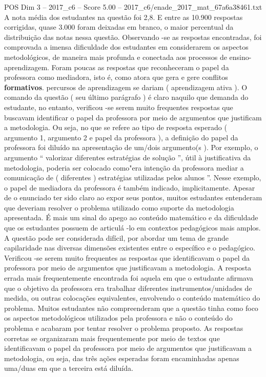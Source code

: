 \begin{textsample}{POS Dim 3 – 2017\_c6 – Score 5.00 – 2017\_c6/enade\_2017\_mat\_67a6a38461.txt}
A nota média dos estudantes na questão foi 2,8.
E entre as 10.900 respostas corrigidas, quase 3.000 foram deixadas em branco, o maior percentual da distribuição das notas nessa questão.
Observando -se as respostas encontradas, foi comprovada a imensa dificuldade dos estudantes em considerarem os aspectos metodológicos, de maneira mais profunda e conectada aos processos de ensino-aprendizagem.
Foram poucas as respostas que reconheceram o papel da professora como mediadora, isto é, como atora que gera e gere conflitos \textbf{formativos}. percursos de aprendizagem se dariam ( aprendizagem ativa ).
O comando da questão ( seu último parágrafo ) é claro naquilo que demanda do estudante, no entanto, verificou -se serem muito frequentes respostas que buscavam identificar o papel da professora por meio de argumentos que justificam a metodologia.
Ou seja, no que se refere ao tipo de resposta esperado ( argumento 1, argumento 2 e papel da professora ), a definição do papel da professora foi diluído na apresentação de um/dois argumento(s ).
Por exemplo, o argumento “ valorizar diferentes estratégias de solução ”, útil à justificativa da metodologia, poderia ser colocado como"era intenção da professora mediar a comunicação de ( diferentes ) estratégias utilizadas pelos alunos ”.
Nesse exemplo, o papel de mediadora da professora é também indicado, implicitamente.
Apesar de o enunciado ter sido claro ao expor seus pontos, muitos estudantes entenderam que deveriam resolver o problema utilizado como suporte da metodologia apresentada.
É mais um sinal do apego ao conteúdo matemático e da dificuldade que os estudantes possuem de articulá -lo em contextos pedagógicos mais amplos.
A questão pode ser considerada difícil, por abordar um tema de grande capilaridade nas diversas dimensões existentes entre o específico e o pedagógico.
Verificou -se serem muito frequentes as respostas que identificavam o papel da professora por meio de argumentos que justificavam a metodologia.
A resposta errada mais frequentemente encontrada foi aquela em que o estudante afirmava que o objetivo da professora era trabalhar diferentes instrumentos/unidades de medida, ou outras colocações equivalentes, envolvendo o conteúdo matemático do problema.
Muitos estudantes não compreenderam que a questão tinha como foco os aspectos metodológicos utilizados pela professora e não o conteúdo do problema e acabaram por tentar resolver o problema proposto.
As respostas corretas se organizaram mais frequentemente por meio de textos que identificavam o papel da professora por meio de argumentos que justificavam a metodologia, ou seja, das três ações esperadas foram encaminhadas apenas uma/duas em que a terceira está diluída.

\end{textsample}
